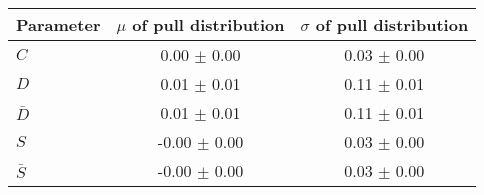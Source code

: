 \begin{tabular}{l  c  c}
\hline
Parameter & $\mu$ of pull distribution & $\sigma$ of pull distribution \\
\hline
\hline
$C$ & 0.00 $\pm$ 0.00 & 0.03 $\pm$ 0.00 \\
$D$ & 0.01 $\pm$ 0.01 & 0.11 $\pm$ 0.01 \\
$\bar{D}$ & 0.01 $\pm$ 0.01 & 0.11 $\pm$ 0.01 \\
$S$ & -0.00 $\pm$ 0.00 & 0.03 $\pm$ 0.00 \\
$\bar{S}$ & -0.00 $\pm$ 0.00 & 0.03 $\pm$ 0.00 \\
\hline
\end{tabular}
